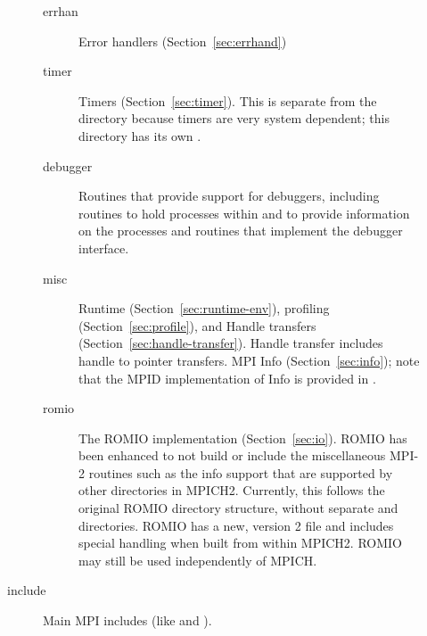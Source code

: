 \documentclass{article}
\begin{document}
\begin{description}
\begin{description}
\begin{description}
    \item[errhan]Error handlers (Section~\ref{sec:errhand})
    \item[timer]Timers (Section~\ref{sec:timer}).  This is separate from the
       directory because timers are very system dependent; this
      directory has its own .
    \item[debugger]Routines that provide support for debuggers, including
      routines to hold processes within  and to 
      provide information on the processes and routines that implement the
      debugger interface.
    \item[misc]Runtime (Section~\ref{sec:runtime-env}), profiling
      (Section~\ref{sec:profile}), and Handle transfers
      (Section~\ref{sec:handle-transfer}).  Handle transfer includes handle to
      pointer transfers. MPI Info (Section~\ref{sec:info}); note that
      the MPID implementation of Info is provided in .
    \item[romio]The ROMIO implementation (Section~\ref{sec:io}).  
      ROMIO has been enhanced to not build or include the miscellaneous MPI-2 
      routines such as the info support that are supported by other 
      directories in MPICH2.  Currently, this follows the original ROMIO
      directory structure, without separate  and 
      directories.    ROMIO has a new, version 2  file and
      includes special handling when built from within MPICH2.  ROMIO may 
      still be used independently of MPICH.
    \end{description}
\item[include]Main MPI includes (like  and ).  

\end{description}
\end{description}
\end{document}
